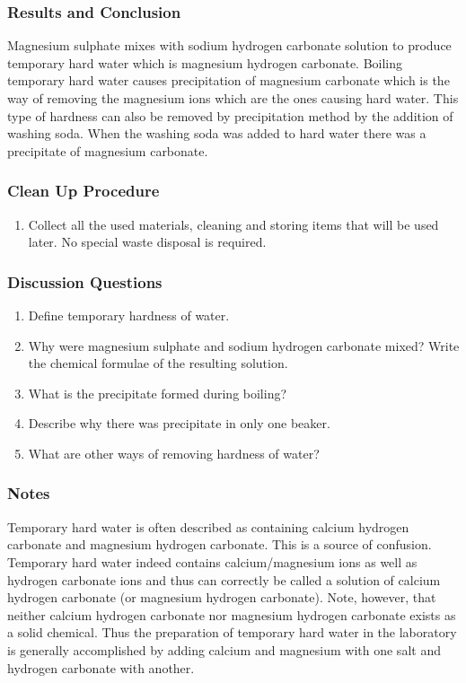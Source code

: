 {\subsubsection*{Results and Conclusion}
Magnesium sulphate mixes with sodium hydrogen carbonate solution to produce temporary hard water which is magnesium hydrogen carbonate. Boiling temporary hard water causes precipitation of magnesium carbonate which is the way of removing the magnesium ions which are the ones causing hard water. This type of hardness can also be removed by precipitation method by the addition of washing soda. When the washing soda was added to hard water there was a precipitate of magnesium carbonate.

\subsubsection*{Clean Up Procedure}
\begin{enumerate}
\item{Collect all the used materials, cleaning and storing items that will be used later. No special waste disposal is required.}
\end{enumerate}

\subsubsection*{Discussion Questions}
\begin{enumerate}
\item{Define temporary hardness of water.}
\item{Why were magnesium sulphate and sodium hydrogen carbonate mixed? Write the chemical formulae of the resulting solution.}
\item{What is the precipitate formed during boiling?}
\item{Describe why there was precipitate in only one beaker.}
\item{What are other ways of removing hardness of water?}
\end{enumerate}

\subsubsection*{Notes}
Temporary hard water is often described as containing calcium hydrogen carbonate and magnesium hydrogen carbonate. This is a source of confusion. Temporary hard water indeed contains calcium/magnesium ions as well as hydrogen carbonate ions and thus can correctly be called a solution of calcium hydrogen carbonate (or magnesium hydrogen carbonate). Note, however, that neither calcium hydrogen carbonate nor magnesium hydrogen carbonate exists as a solid chemical. Thus the preparation of temporary hard water in the laboratory is generally accomplished by adding calcium and magnesium with one salt and hydrogen carbonate with another.

}
